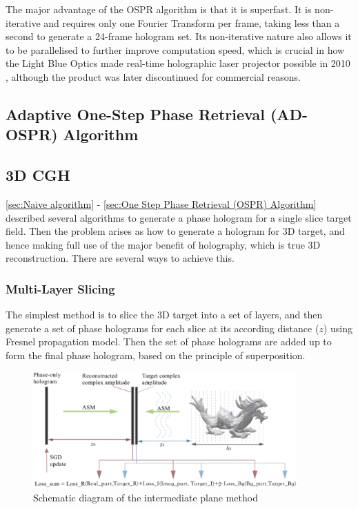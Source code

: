 The major advantage of the OSPR algorithm is that it is superfast. It is non-iterative and requires only one Fourier Transform per frame, taking less than a second to generate a 24-frame hologram set. Its non-iterative nature also allows it to be parallelised to further improve computation speed, which is crucial in how the Light Blue Optics made real-time holographic laser projector possible in 2010 \cite{Buckley2008}, although the product was later discontinued for commercial reasons.

\subsection{Adaptive One-Step Phase Retrieval (AD-OSPR) Algorithm}\label{sec:One Step Phase Retrieval (AD-OSPR) Algorithm}


\subsection{3D CGH}
\cref{sec:Naive algorithm} - \cref{sec:One Step Phase Retrieval (OSPR) Algorithm} described several algorithms to generate a phase hologram for a single slice target field. Then the problem arises as how to generate a hologram for 3D target, and hence making full use of the major benefit of holography, which is true 3D reconstruction. There are several ways to achieve this.

\subsubsection{Multi-Layer Slicing}
The simplest method is to slice the 3D target into a set of layers, and then generate a set of phase holograms for each slice at its according distance ($z$) using Fresnel propagation model. Then the set of phase holograms are added up to form the final phase hologram, based on the principle of superposition.

\begin{figure}[H]
  \centering
  \includegraphics[width=0.9\textwidth]{intermediate_plane.png}
  \caption{Schematic diagram of the intermediate plane method \cite{Chen2021}}
  \label{fig:intermediate_plane}
\end{figure}

